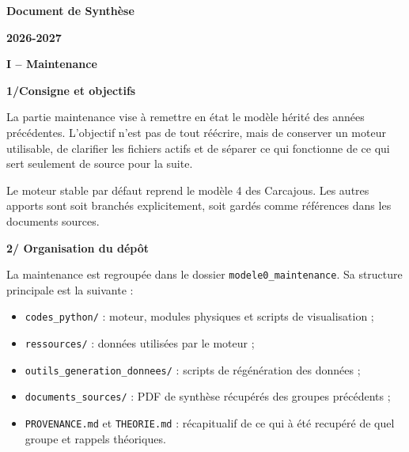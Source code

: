 \documentclass[11pt,a4paper]{article}
\newcommand{\code}[1]{\texttt{#1}}
\newcommand{\titreprincipal}[1]{%
    \begin{tcolorbox}[
        colback=white,
        colframe=DocRed,
        boxrule=1pt,
        arc=1mm,
        left=3mm,
        right=3mm,
        top=2mm,
        bottom=2mm
    ]
    {\LARGE\bfseries\textcolor{DocRed}{#1}}
    \end{tcolorbox}
}
\newcommand{\partietitre}[1]{%
    \vspace{1.1em}
    {\Large\bfseries\textcolor{DocRed}{#1}}\par
    \vspace{0.35em}
}
\begin{document}
\begin{titlepage}
    \centering
    \vspace*{2cm}

    {\Huge\bfseries\textcolor{DocRed}{Document de Synthèse}\par}
    \vspace{0.8cm}
    {\LARGE\bfseries 2026-2027\par}
    \vspace{0.4cm}
    {\Large\par}

    \vfill

\end{titlepage}

\tableofcontents
\newpage

\titreprincipal{I -- Maintenance}

\partietitre{1/Consigne et objectifs}

La partie maintenance vise à remettre en état le modèle hérité des années précédentes. L'objectif n'est pas de tout réécrire, mais de conserver un moteur utilisable, de clarifier les fichiers actifs et de séparer ce qui fonctionne de ce qui sert seulement de source pour la suite.

Le moteur stable par défaut reprend le modèle 4 des Carcajous. Les autres apports sont soit branchés explicitement, soit gardés comme références dans les documents sources.

\partietitre{2/ Organisation du dépôt}

La maintenance est regroupée dans le dossier \code{modele0\_maintenance}. Sa structure principale est la suivante :

\begin{itemize}
    \item \code{codes\_python/} : moteur, modules physiques et scripts de visualisation ;
    \item \code{ressources/} : données utilisées par le moteur ;
    \item \code{outils\_generation\_donnees/} : scripts de régénération des données ;
    \item \code{documents\_sources/} : PDF de synthèse récupérés des groupes précédents ;
    \item \code{PROVENANCE.md} et \code{THEORIE.md} : récapitualif de ce qui à été recupéré de quel groupe et rappels théoriques.
\end{itemize}
\end{document}
